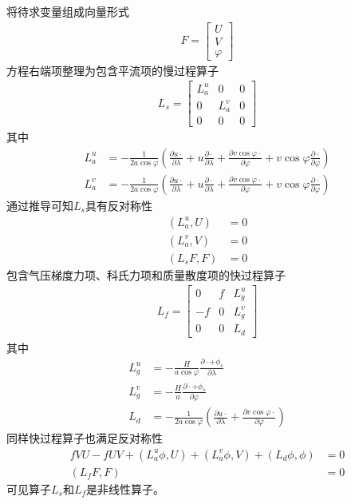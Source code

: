 \documentclass{ctexart}
\begin{document}
将待求变量组成向量形式
\begin{align}
  F = \left[
    \begin{array}{c}
      U \\
      V \\
      \varphi
    \end{array}
  \right]
\end{align}
方程右端项整理为包含平流项的慢过程算子
\begin{align}
  L_s = \left[
    \begin{array}{ccc}
      L_a^u & 0 & 0 \\
      0 & L_a^v & 0 \\
      0 & 0 & 0
    \end{array}
  \right]
\end{align}
其中
\begin{align}
  L_a^u & = - \frac{1}{2 a \cos{\varphi}} \left( \frac{\partial u \cdot}{\partial \lambda} + u \frac{\partial \cdot}{\partial \lambda} + \frac{\partial v \cos{\varphi} \cdot}{\partial \varphi} + v \cos{\varphi} \frac{\partial \cdot}{\partial \varphi}  \right) \\
  L_a^v & = - \frac{1}{2 a \cos{\varphi}} \left( \frac{\partial u \cdot}{\partial \lambda} + u \frac{\partial \cdot}{\partial \lambda} + \frac{\partial v \cos{\varphi} \cdot}{\partial \varphi} + v \cos{\varphi} \frac{\partial \cdot}{\partial \varphi} \right)
\end{align}
通过推导可知$L_s$具有反对称性
\begin{align}
  (L_a^u, U) & = 0 \\
  (L_a^v, V) & = 0 \\
  (L_s F, F) & = 0
\end{align}
包含气压梯度力项、科氏力项和质量散度项的快过程算子
\begin{align}
  L_f = \left[
    \begin{array}{ccc}
      0 & f & L_g^u \\
      -f & 0 & L_g^v \\
      0 & 0 & L_d
    \end{array}
  \right]
\end{align}
其中
\begin{align}
  L_g^u & = - \frac{H}{a \cos{\varphi}} \frac{\partial \cdot + \phi_s}{\partial \lambda} \\
  L_g^v & = - \frac{H}{a} \frac{\partial \cdot + \phi_s}{\partial \varphi} \\
  L_d & = - \frac{1}{2 a \cos{\varphi}} \left( \frac{\partial u \cdot}{\partial \lambda} + \frac{\partial v \cos{\varphi} \cdot}{\partial \varphi} \right)
\end{align}
同样快过程算子也满足反对称性
\begin{align}
  f V U - f U V + (L_a^u \phi, U) + (L_a^v \phi, V) + (L_d \phi, \phi) & = 0 \\
  (L_f F, F) & = 0
\end{align}
可见算子$L_s$和$L_f$是非线性算子。
\end{document}
